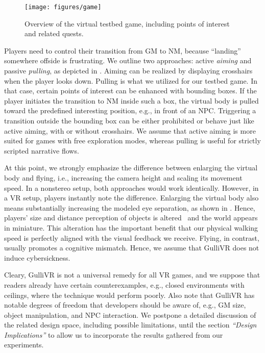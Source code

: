 \documentclass{sigchi}
\begin{document}
\begin{figure*}[t!]
\centering
\texttt{[image: figures/game]}
\caption{Overview of the virtual testbed game, including points of interest and related quests.}
\label{fig:game}
\end{figure*}


Players need to control their transition from GM to NM, because ``landing'' somewhere offside is frustrating. We outline two approaches: active \textit{aiming} and passive \textit{pulling}, as depicted in . Aiming can be realized by displaying crosshairs when the player looks down. Pulling is what we utilized for our testbed game. In that case, certain points of interest can be enhanced with bounding boxes. If the player initiates the transition to NM inside such a box, the virtual body is pulled toward the predefined interesting position, e.g., in front of an NPC. Triggering a transition outside the bounding box can be either prohibited or behave just like active aiming, with or without crosshairs. We assume that active aiming is more suited for games with free exploration modes, whereas pulling is useful for strictly scripted narrative flows.

At this point, we strongly emphasize the difference between enlarging the virtual body and flying, i.e., increasing the camera height and scaling its movement speed. In a nonstereo setup, both approaches would work identically. However, in a VR setup, players instantly note the difference. Enlarging the virtual body also means substantially increasing the modeled eye separation, as shown in . Hence, players' size and distance perception of objects is altered~\cite{van2011being, renner2015influence} and the world appears in miniature. This alteration has the important benefit that our physical walking speed is perfectly aligned with the visual feedback we receive. Flying, in contrast, usually promotes a cognitive mismatch. Hence, we assume that GulliVR does not induce cybersickness.


Cleary, GulliVR is not a universal remedy for all VR games, and we suppose that readers already have certain counterexamples, e.g., closed environments with ceilings, where the technique would perform poorly. Also note that GulliVR has notable degrees of freedom that developers should be aware of, e.g., GM size, object manipulation, and NPC interaction. We postpone a detailed discussion of the related design space, including possible limitations, until the section \textit{``Design Implications''} to allow us to incorporate the results gathered from our experiments. 
\end{document}
